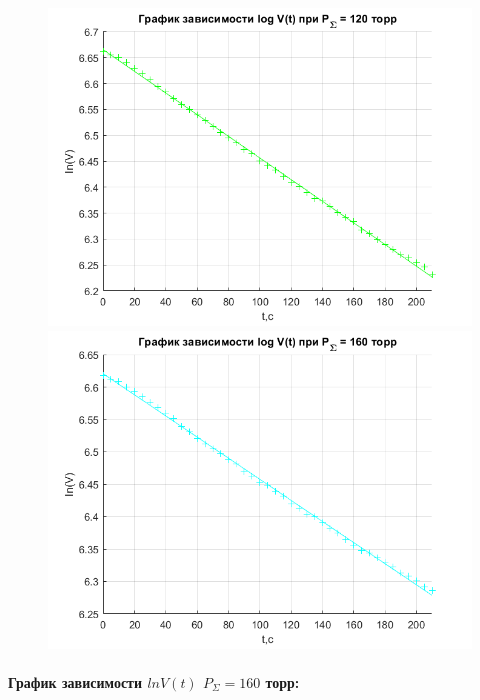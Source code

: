 \documentclass[a4paper,12pt]{article}
\begin{document}
\begin{figure}[h]
\begin{center}
\begin{minipage}[h]{0.45\linewidth}
\includegraphics[width=1\linewidth]{gr_120_t.png}
\end{minipage}
\hfill
\begin{minipage}[h]{0.45\linewidth}
\includegraphics[width=1\linewidth]{gr_160_t.png}
\end{minipage}
\end{center}
\end{figure}
\paragraph{График зависимости $lnV(t)$ $P_{\Sigma} = 160$ торр:}
\end{document}
